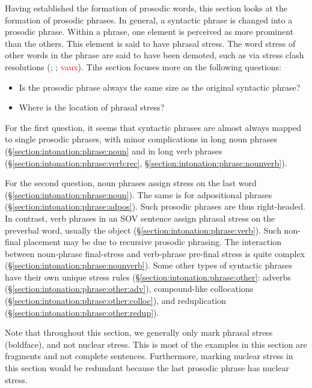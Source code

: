 Having established the formation of prosodic words, this section looks at the formation of prosodic phrases. In general, a syntactic phrase is changed into a prosodic phrase. Within a phrase, one element is perceived as more prominent than the others. This element is said to have phrasal stress. The word stress of other words in the phrase are said to have been demoted, such as via stress clash resolutions (\citealt[28]{Abeghyan-1933-Meter}; \citealt[24-7]{Fairbanks-1948-PhonologyMorphoWestern}; \textcolor{red}{vaux}). Tihs section focuses more on the following questions:
\begin{itemize}[noitemsep, topsep=0pt]
	\item Is the prosodic phrase always the same size as the original syntactic phrase?
	\item Where is the location of phrasal stress? 
\end{itemize}

For the first question, it seems that syntactic phrases are almost always mapped to single prosodic phrases, with minor complications in long noun phrases (\S\ref{section:intonation:phrase:noun} and in long verb phrases (\S\ref{section:intonation:phrase:verb:rec}, \S\ref{section:intonation:phrase:nounverb}). 

For the second question,   noun phrases assign stress on the last word (\S\ref{section:intonation:phrase:noun}). The same is for adpositional phrases (\S\ref{section:intonation:phrase:adpos}). Such prosodic phrases are thus right-headed. In contrast, verb phrases in an SOV sentence assign phrasal stress on the preverbal word, usually the object (\S\ref{section:intonation:phrase:verb}). Such non-final placement may be due to recursive prosodic phrasing. The interaction between noun-phrase final-stress and verb-phrase pre-final stress is quite complex (\S\ref{section:intonation:phrase:nounverb}). Some other types of syntactic phrases have their own unique stress rules (\S\ref{section:intonation:phrase:other}: adverbs (\S\ref{section:intonation:phrase:other:adv}), compound-like collocations (\S\ref{section:intonation:phrase:other:colloc}), and reduplication (\S\ref{section:intonation:phrase:other:redup}).

Note that throughout this section, we generally only mark phrasal stress (boldface), and not nuclear stress. This is most of the examples in this section are fragments and not complete sentences. Furthermore, marking nuclear stress in this section would be redundant because the last prosodic phrase has nuclear stress. 

